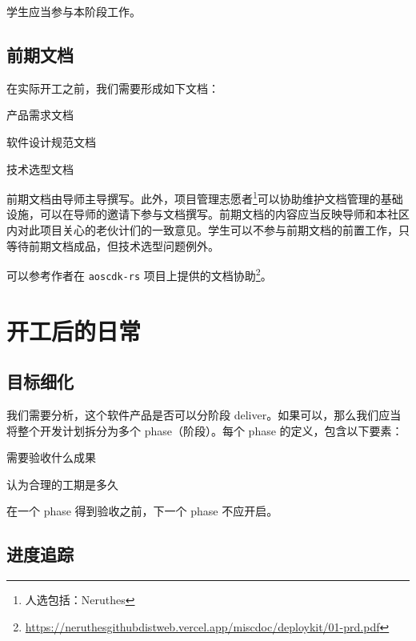 学生应当参与本阶段工作。

\subsection{前期文档}

在实际开工之前，我们需要形成如下文档：

\begin{compactitem}
	\item 产品需求文档
	\item 软件设计规范文档
	\item 技术选型文档
\end{compactitem}

前期文档由导师主导撰写。此外，项目管理志愿者\footnote{人选包括：Neruthes}可以协助维护文档管理的基础设施，可以在导师的邀请下参与文档撰写。前期文档的内容应当反映导师和本社区内对此项目关心的老伙计们的一致意见。学生可以不参与前期文档的前置工作，只等待前期文档成品，但技术选型问题例外。

可以参考作者在 \texttt{aoscdk-rs} 项目上提供的文档协助\footnote{\href{https://neruthesgithubdistweb.vercel.app/miscdoc/deploykit/01-prd.pdf}{https://neruthesgithubdistweb.vercel.app/miscdoc/deploykit/01-prd.pdf}}。







\section{开工后的日常}

\subsection{目标细化}

我们需要分析，这个软件产品是否可以分阶段 deliver。如果可以，那么我们应当将整个开发计划拆分为多个 phase（阶段）。每个 phase 的定义，包含以下要素：

\begin{compactitem}
    \item 需要验收什么成果
    \item 认为合理的工期是多久
\end{compactitem}

在一个 phase 得到验收之前，下一个 phase 不应开启。

\subsection{进度追踪}


